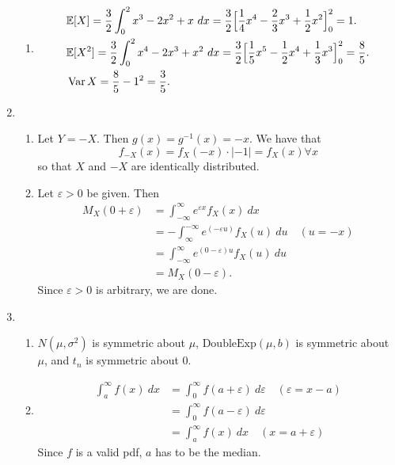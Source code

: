 \documentclass{article}
\DeclareMathOperator{\var}{Var}
\begin{document}
\begin{enumerate}
\begin{enumerate}
        \item \begin{align*}
            &\mathbb{E}[X] 
            = \frac{3}{2}\int_{0}^{2} x^3 - 2x^2 + x \ dx 
            = \frac{3}{2} \Bigl[ \frac{1}{4}x^4 - \frac{2}{3}x^3 + \frac{1}{2}x^2 \Bigr]_{0}^{2} 
            = 1. \\
            &\mathbb{E}[X^2] 
            = \frac{3}{2}\int_{0}^{2} x^4 - 2x^3 + x^2 \ dx 
            = \frac{3}{2} \Bigl[ \frac{1}{5}x^5 - \frac{1}{2}x^4 + \frac{1}{3}x^3 \Bigr]_{0}^{2} 
            = \frac{8}{5}. \\
            &\var{X} 
            = \frac{8}{5} - 1^2 
            = \frac{3}{5}.
        \end{align*}
    \end{enumerate}

    \item \begin{enumerate}
        \item Let $Y = -X$. Then $g(x) = g^{-1}(x) = -x$. We have that 
        \[ f_{-X}(x) = f_{X}(-x) \cdot |-1| = f_{X}(x) \forall x \]
        so that $X$ and $-X$ are identically distributed.

        \item Let $\varepsilon > 0$ be given. Then 
        \begin{align*}
            M_X(0 + \varepsilon)
            &= \int_{-\infty}^{\infty} e^{\varepsilon x} f_X(x) \ dx \\
            &= -\int_{\infty}^{-\infty} e^{(-\varepsilon u)} f_X(u) \ du \quad (u = -x) \\
            &= \int_{-\infty}^{\infty} e^{(0 - \varepsilon)u} f_X(u) \ du \\
            &= M_X(0 - \varepsilon).
        \end{align*}
        Since $\varepsilon > 0$ is arbitrary, we are done.
    \end{enumerate}

    \item \begin{enumerate}
        \item $N(\mu, \sigma^2)$ is symmetric about $\mu$, $\text{DoubleExp}(\mu, b)$ is 
        symmetric about $\mu$, and $t_n$ is symmetric about 0.

        \item \begin{align*}
            \int_{a}^{\infty} f(x) \ dx
            &= \int_{0}^{\infty} f(a + \varepsilon) \ d\varepsilon \quad (\varepsilon = x - a) \\
            &= \int_{0}^{\infty} f(a - \varepsilon) \ d\varepsilon \\
            &= \int_{a}^{\infty} f(x) \ dx \quad (x = a + \varepsilon)
        \end{align*}
        Since $f$ is a valid pdf, $a$ has to be the median.


\end{enumerate}
\end{enumerate}
\end{document}
